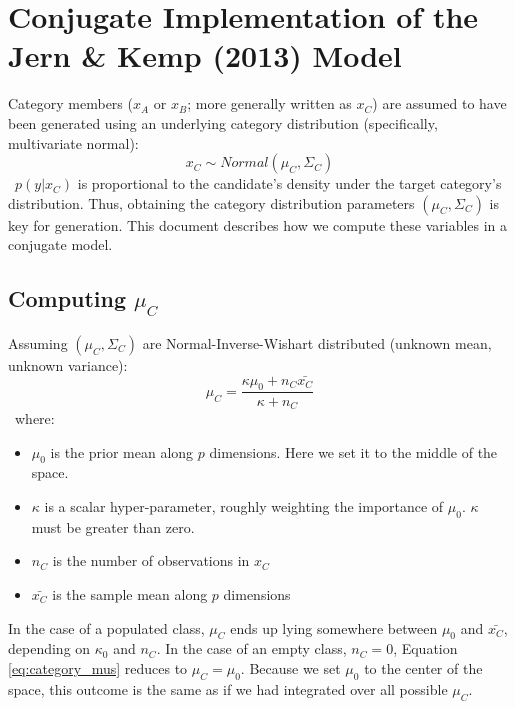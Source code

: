 \documentclass[12pt]{article}
\begin{document}
\VerbatimFootnotes

\section*{Conjugate Implementation of the Jern \& Kemp (2013) Model}

Category members ($x_A$ or $x_B$; more generally written as $x_C$) are assumed to have been generated using an underlying category distribution (specifically, multivariate normal):
\
\begin{equation}
  x_C \sim Normal(\mu_{C}, \Sigma_{C})
\end{equation}
\
$p(y | x_C)$ is proportional to the candidate's density under the target category's distribution. Thus, obtaining the category distribution parameters $(\mu_{C}, \Sigma_{C})$ is key for generation. This document describes how we compute these variables in a conjugate model. 

\subsection*{Computing $\mu_C$}
Assuming $(\mu_C, \Sigma_C)$ are Normal-Inverse-Wishart distributed (unknown mean, unknown variance):
\
\begin{equation}
  \mu_C = \dfrac
    {\kappa\mu_{0} + n_C \bar{x_C}}
    {\kappa + n_C}
    \label{eq:category_mus}
\end{equation}
\ 
where:
\begin{itemize}
    \setlength\itemsep{-0.5em}
    \item $\mu_{0}$ is the prior mean along $p$ dimensions. Here we set it to the middle of the space.
    \item $\kappa$ is a scalar hyper-parameter, roughly weighting the importance of $\mu_{0}$. $\kappa$ must be greater than zero.
    \item $n_C$ is the number of observations in $x_C$
    \item $\bar{x_C}$ is the sample mean along $p$ dimensions
\end{itemize}

In the case of a populated class, $\mu_{C}$ ends up lying somewhere between $\mu_{0}$ and $\bar{x_C}$, depending on $\kappa_{0}$ and $n_C$. In the case of an empty class, $n_C = 0$, Equation \ref{eq:category_mus} reduces to $\mu_{C} = \mu_{0}$. Because we set $\mu_0$ to the center of the space, this outcome is the same as if we had integrated over all possible $\mu_C$. 
\end{document}
